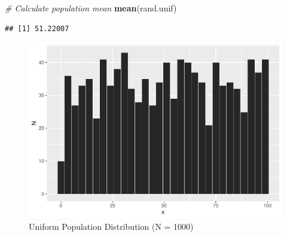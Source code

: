 \documentclass[]{book}
\newenvironment{Shaded}{\begin{snugshade}}{\end{snugshade}}
\newcommand{\CommentTok}[1]{\textcolor[rgb]{0.56,0.35,0.01}{\textit{#1}}}
\newcommand{\DataTypeTok}[1]{\textcolor[rgb]{0.13,0.29,0.53}{#1}}
\newcommand{\FloatTok}[1]{\textcolor[rgb]{0.00,0.00,0.81}{#1}}
\newcommand{\KeywordTok}[1]{\textcolor[rgb]{0.13,0.29,0.53}{\textbf{#1}}}
\newcommand{\NormalTok}[1]{#1}
\newcommand{\OperatorTok}[1]{\textcolor[rgb]{0.81,0.36,0.00}{\textbf{#1}}}
\newcommand{\StringTok}[1]{\textcolor[rgb]{0.31,0.60,0.02}{#1}}
\begin{document}
\begin{Shaded}
\begin{Highlighting}[]
\CommentTok{# Calculate population mean}
\KeywordTok{mean}\NormalTok{(rand.unif)}
\end{Highlighting}
\end{Shaded}

\begin{verbatim}
## [1] 51.22007
\end{verbatim}

\begin{Shaded}
\end{Shaded}

\begin{figure}

{\centering \includegraphics{_main_files/figure-latex/unnamed-chunk-12-1} 

}

\caption{Uniform Population Distribution (N = 1000)}\label{fig:unnamed-chunk-12}
\end{figure}
\end{document}
